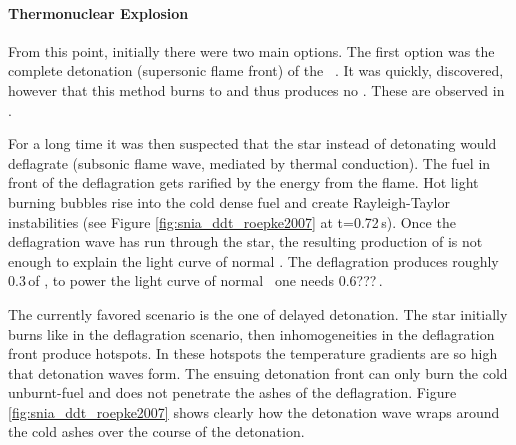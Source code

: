 \paragraph{Thermonuclear Explosion}
From this point, initially there were two main options. The first option was the complete detonation (supersonic flame front) of the \cowd\ \citep{1969Ap&SS...5..180A}. It was quickly, discovered, however that this method burns to \nse and thus produces no \ime. These \ime are observed in \snia.

For a long time it was then suspected that the star instead of detonating would deflagrate (subsonic flame wave, mediated by thermal conduction). The fuel in front of the deflagration gets rarified by the energy from the flame. Hot light burning bubbles rise into the cold dense fuel and create Rayleigh-Taylor instabilities (see Figure \ref{fig:snia_ddt_roepke2007} at t=0.72\,s). 
Once the deflagration wave has run through the star, the resulting production of \Ni[56] is not enough to explain the light curve of normal \snia. The deflagration produces roughly 0.3\,\msun of \Ni[56], to power the light curve of normal \sneia\ one needs 0.6???\,\msun.

The currently favored scenario is the one of delayed detonation. The star initially burns like in the deflagration scenario, then inhomogeneities in the deflagration front produce hotspots. In these hotspots the temperature gradients are so high that detonation waves form. The ensuing detonation front can only burn the cold unburnt-fuel and does not penetrate the ashes of the deflagration. Figure \ref{fig:snia_ddt_roepke2007} shows clearly how the detonation wave wraps around the cold ashes over the course of the detonation.


